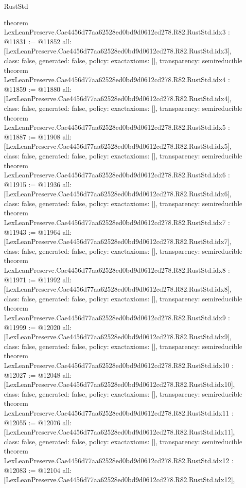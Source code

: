 \begin{lexlean}{RustStd}
\begin{coremodule}
{}
theorem LexLeanPreserve.Cae4456d77aa62528ed0bd9d0612cd278.R82.RustStd.idx3 : @11831 := @11852 {
  all: [LexLeanPreserve.Cae4456d77aa62528ed0bd9d0612cd278.R82.RustStd.idx3],
  class: false,
  generated: false,
  policy: exact{axioms: []},
  transparency: semireducible
}
theorem LexLeanPreserve.Cae4456d77aa62528ed0bd9d0612cd278.R82.RustStd.idx4 : @11859 := @11880 {
  all: [LexLeanPreserve.Cae4456d77aa62528ed0bd9d0612cd278.R82.RustStd.idx4],
  class: false,
  generated: false,
  policy: exact{axioms: []},
  transparency: semireducible
}
theorem LexLeanPreserve.Cae4456d77aa62528ed0bd9d0612cd278.R82.RustStd.idx5 : @11887 := @11908 {
  all: [LexLeanPreserve.Cae4456d77aa62528ed0bd9d0612cd278.R82.RustStd.idx5],
  class: false,
  generated: false,
  policy: exact{axioms: []},
  transparency: semireducible
}
theorem LexLeanPreserve.Cae4456d77aa62528ed0bd9d0612cd278.R82.RustStd.idx6 : @11915 := @11936 {
  all: [LexLeanPreserve.Cae4456d77aa62528ed0bd9d0612cd278.R82.RustStd.idx6],
  class: false,
  generated: false,
  policy: exact{axioms: []},
  transparency: semireducible
}
theorem LexLeanPreserve.Cae4456d77aa62528ed0bd9d0612cd278.R82.RustStd.idx7 : @11943 := @11964 {
  all: [LexLeanPreserve.Cae4456d77aa62528ed0bd9d0612cd278.R82.RustStd.idx7],
  class: false,
  generated: false,
  policy: exact{axioms: []},
  transparency: semireducible
}
theorem LexLeanPreserve.Cae4456d77aa62528ed0bd9d0612cd278.R82.RustStd.idx8 : @11971 := @11992 {
  all: [LexLeanPreserve.Cae4456d77aa62528ed0bd9d0612cd278.R82.RustStd.idx8],
  class: false,
  generated: false,
  policy: exact{axioms: []},
  transparency: semireducible
}
theorem LexLeanPreserve.Cae4456d77aa62528ed0bd9d0612cd278.R82.RustStd.idx9 : @11999 := @12020 {
  all: [LexLeanPreserve.Cae4456d77aa62528ed0bd9d0612cd278.R82.RustStd.idx9],
  class: false,
  generated: false,
  policy: exact{axioms: []},
  transparency: semireducible
}
theorem LexLeanPreserve.Cae4456d77aa62528ed0bd9d0612cd278.R82.RustStd.idx10 : @12027 := @12048 {
  all: [LexLeanPreserve.Cae4456d77aa62528ed0bd9d0612cd278.R82.RustStd.idx10],
  class: false,
  generated: false,
  policy: exact{axioms: []},
  transparency: semireducible
}
theorem LexLeanPreserve.Cae4456d77aa62528ed0bd9d0612cd278.R82.RustStd.idx11 : @12055 := @12076 {
  all: [LexLeanPreserve.Cae4456d77aa62528ed0bd9d0612cd278.R82.RustStd.idx11],
  class: false,
  generated: false,
  policy: exact{axioms: []},
  transparency: semireducible
}
theorem LexLeanPreserve.Cae4456d77aa62528ed0bd9d0612cd278.R82.RustStd.idx12 : @12083 := @12104 {
  all: [LexLeanPreserve.Cae4456d77aa62528ed0bd9d0612cd278.R82.RustStd.idx12],
}
\end{coremodule}
\end{lexlean}
